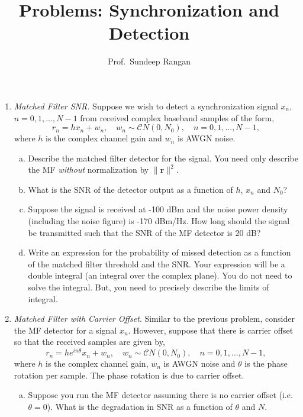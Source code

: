 \documentclass[11pt]{article}
\newcommand{\rbf}{\mathbf{r}}
\begin{document}
\title{Problems:  Synchronization and Detection}
\author{Prof.\ Sundeep Rangan}
\date{}

\maketitle

\begin{enumerate}

\item \emph{Matched Filter SNR.}
Suppose we wish to detect a synchronization signal $x_n$, $n=0,1,\ldots,N-1$ from 
received complex baseband samples of the form,
\[
    r_n = hx_n + w_n, \quad w_n \sim {\mathcal CN}(0,N_0),
    \quad n=0,1,\ldots,N-1,
\]
where $h$ is the complex channel gain and $w_n$ is AWGN noise.
\begin{enumerate}[(a)]
\item Describe the matched filter detector for the signal.
You need only describe the MF \emph{without} normalization by $\|\rbf\|^2$.
\item What is the SNR of the detector output as a function of $h$,
$x_n$ and $N_0$?
\item Suppose the signal is received at -100 dBm and the noise
power density (including the noise figure) is -170 dBm/Hz.
How long should the signal be transmitted such that the SNR of the MF
detector is 20 dB?
\item Write an expression for the probability of missed detection
as a function of the matched filter threshold and the SNR.
Your expression will be a double integral (an integral over the complex
plane).  You do not need to solve the integral.  But, you need to precisely
describe the limits of integral.
\end{enumerate}

\item \emph{Matched Filter with Carrier Offset}.
Similar to the previous problem, consider the MF detector for a 
signal $x_n$.  However, suppose that there is carrier offset
so that the received samples are given by,
\[
    r_n = he^{in\theta}x_n + w_n, \quad w_n \sim {\mathcal CN}(0,N_0),
    \quad n=0,1,\ldots,N-1,
\]
where $h$ is the complex channel gain, $w_n$ is AWGN noise
and $\theta$ is the phase rotation per sample.  The phase rotation is
due to carrier offset.  
\begin{enumerate}[(a)]
\item Suppose you run the MF detector assuming
there is no carrier offset (i.e.\ $\theta=0$).  What is the degradation in
SNR as a function of $\theta$ and $N$.


\end{enumerate}
\end{enumerate}
\end{document}
